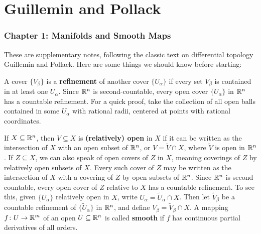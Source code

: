 \part{Guillemin and Pollack}
\section{Chapter 1: Manifolds and Smooth Maps}
\begin{center}
\end{center}
These are supplementary notes, following the classic text on differential topology Guillemin and Pollack. Here are some things we should know before starting:

A cover $\{V_{\beta }\} $ is a \textbf{refinement} of another cover $\{U_{\alpha }\} $ if every set $V_{\beta }$ is contained in at least one $U_{\alpha }$. Since $\mathbb{R}^n $ is second-countable, every open cover $\{U_{\alpha }\} $ in $\mathbb{R}^n $ has a countable refinement. For a quick proof, take the collection of all open balls contained in some $U_{\alpha }$ with rational radii, centered at points with rational coordinates.

If $X\subseteq \mathbb{R}^n $, then $V\subseteq X$ is \textbf{(relatively) open} in $X$ if it can be written as the intersection of $X$ with an open subset of $\mathbb{R}^n$, or $V= \widetilde V \cap X$, where $\widetilde V$ is open in $\mathbb{R}^n $. If $Z\subseteq X$, we can also speak of open covers of $Z$ in $X$, meaning coverings of $Z$ by relatively open subsets of $X$. Every such cover of $Z$ may be written as the intersection of $X$ with a covering of $Z$ by open subsets of $\mathbb{R}^n $. Since $\mathbb{R}^n $ is second countable, every open cover of $Z$ relative to $X$ has a countable refinement. To see this, given $\{U_{\alpha }\} $ relatively open in $X$, write $U_{\alpha }= \widetilde U_{\alpha }\cap  X$. Then let $\widetilde V _{\beta }$ be a countable refinement of $\{\widetilde U_{\alpha }\} $ in $\mathbb{R}^n $, and define $V_{\beta }=\widetilde V_{\beta }\cap X$.
\orbreak
A mapping $f \colon U \to \mathbb{R}^m $ of an open $U\subseteq \mathbb{R}^n $ is called \textbf{smooth} if $f$ has continuous partial derivatives of all orders.
